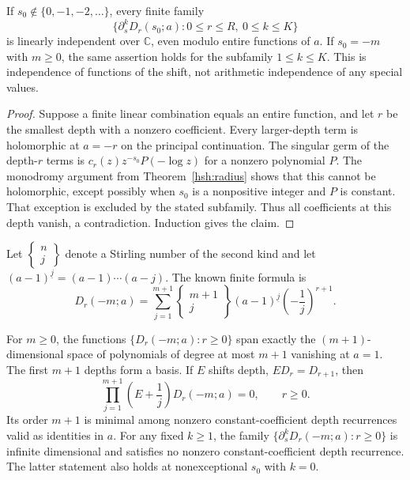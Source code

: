 \begin{corollary}
\label{hsh:independence}
If $s_0\notin\{0,-1,-2,\ldots\}$, every finite family
\[
 \{\partial_s^kD_r(s_0;a):0\leq r\leq R,\ 0\leq k\leq K\}
\]
is linearly independent over $\mathbb C$, even modulo entire
functions of $a$.  If $s_0=-m$ with $m\geq0$, the same assertion
holds for the subfamily $1\leq k\leq K$.
This is independence of functions of the shift, not arithmetic
independence of any special values.
\end{corollary}

\begin{proof}
Suppose a finite linear combination equals an entire function,
and let $r$ be the smallest depth with a nonzero coefficient.
Every larger-depth term is holomorphic at $a=-r$ on the principal
continuation.  The singular germ of the depth-$r$ terms is
$c_r(z)z^{-s_0}P(-\log z)$ for a nonzero polynomial $P$.
The monodromy argument from Theorem~\ref{hsh:radius} shows that
this cannot be holomorphic, except possibly when $s_0$ is a
nonpositive integer and $P$ is constant.  That exception is
excluded by the stated subfamily.  Thus all coefficients at
this depth vanish, a contradiction.  Induction gives the claim.
\end{proof}

Let $\left\{\begin{smallmatrix}n\\j\end{smallmatrix}\right\}$
denote a Stirling number of the second kind and let
$(a-1)^{\underline j}=(a-1)\cdots(a-j)$.
The known finite formula \cite{RepoExact,RepoMixed} is
\begin{equation}\label{hsh:finiteStirling}
 D_r(-m;a)=\sum_{j=1}^{m+1}
 \left\{\begin{matrix}m+1\\j\end{matrix}\right\}
           (a-1)^{\underline j}\left(-\frac1j\right)^{r+1}.
\end{equation}

\begin{proposition}
\label{hsh:rank}
For $m\geq0$, the functions $\{D_r(-m;a):r\geq0\}$ span
exactly the $(m+1)$-dimensional space of polynomials of degree
at most $m+1$ vanishing at $a=1$.  The first $m+1$ depths form
a basis.  If $E$ shifts depth, $ED_r=D_{r+1}$, then
\begin{equation}\label{hsh:recurrence}
 \boxed{\displaystyle
       \prod_{j=1}^{m+1}\left(E+\frac1j\right)D_r(-m;a)=0,
       \qquad r\geq0.}
\end{equation}
Its order $m+1$ is minimal among nonzero constant-coefficient
depth recurrences valid as identities in $a$.
For any fixed $k\geq1$, the family
$\{\partial_s^kD_r(-m;a):r\geq0\}$ is infinite dimensional and
satisfies no nonzero constant-coefficient depth recurrence.
The latter statement also holds at nonexceptional $s_0$ with $k=0$.
\end{proposition}

